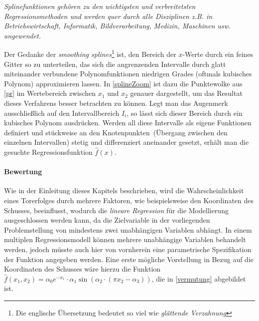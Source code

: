 \begin{itemize}

\textit{\glqq Splinefunktionen gehören zu den wichtigsten und verbreitetsten Regressionsmethoden und werden quer durch alle Disziplinen z.B. in Betriebswirtschaft, Informatik, Bildverarbeitung, Medizin, Maschinen usw. angewendet.\grqq} 

\enlargethispage{\baselineskip}Der Gedanke der \textit{smoothing splines}\footnote{Die englische Übersetzung bedeutet so viel wie \textit{glättende Verzahnung}} ist, den Bereich der $x$-Werte durch ein feines Gitter so zu unterteilen, das sich die angrenzenden Intervalle durch glatt miteinander verbundene Polynomfunktionen niedrigen Grades (oftmals kubisches Polynom) approximieren lassen. In \vref{splineZoom} ist dazu die Punktewolke aus \vref{pr} im Wertebereich zwischen $x_1$ und $x_2$ genauer dargestellt, um das Resultat dieses Verfahrens besser betrachten zu können. Legt man das Augenmerk ausschließlich auf den Intervallbereich $I_i$, so lässt sich dieser Bereich durch ein kubisches Polynom ausdrücken. Werden all diese Intervalle als eigene Funktionen definiert und stückweise an den \glqq Knotenpunkten\grqq~(Übergang zwischen den einzelnen Intervallen) stetig und differenziert aneinander gesetzt, erhält man die gesuchte Regressionsfunktion $\hat{f}(x)$.
\end{itemize}




\paragraph{Bewertung} Wie in der Einleitung dieses Kapitels beschrieben, wird die Wahrscheinlichkeit eines Torerfolges durch mehrere Faktoren, wie beispielsweise den Koordinaten des Schusses, beeinflusst, wodurch die \textit{lineare Regression} für die Modellierung ausgeschlossen werden kann, da die Zielvariable in der vorliegenden Problemstellung von mindestens zwei unabhängigen Variablen abhängt. In einem multiplen Regressionsmodell können mehrere unabhängige Variablen behandelt werden, jedoch müsste auch hier von vornherein eine parametrische Spezifikation der Funktion angegeben werden. Eine erste mögliche Vorstellung in Bezug auf die Koordinaten des Schusses wäre hierzu die Funktion $\hat{f}(x_1,x_2) = \alpha_0 e^{-x_1} \cdot \alpha_1\sin(\alpha_2 \cdot (\pi x_2 - \alpha_3))$, die in \vref{vermutung} abgebildet ist. 


